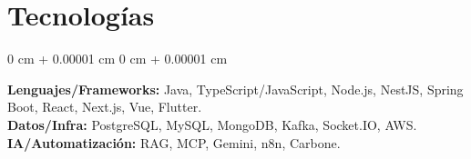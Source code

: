 \documentclass[10pt, letterpaper]{article}
\newenvironment{onecolentry}{
    \begin{adjustwidth}{
        0 cm + 0.00001 cm
    }{
        0 cm + 0.00001 cm
    }
}{
    \end{adjustwidth}
} %
\begin{document}



\section{Tecnologías}
\begin{onecolentry}
  \textbf{Lenguajes/Frameworks:} Java, TypeScript/JavaScript, Node.js, NestJS, Spring Boot, React, Next.js, Vue, Flutter. \\
  \textbf{Datos/Infra:} PostgreSQL, MySQL, MongoDB, Kafka, Socket.IO, AWS. \\
  \textbf{IA/Automatización:} RAG, MCP, Gemini, n8n, Carbone. \\
\end{onecolentry}

    
\end{document}

